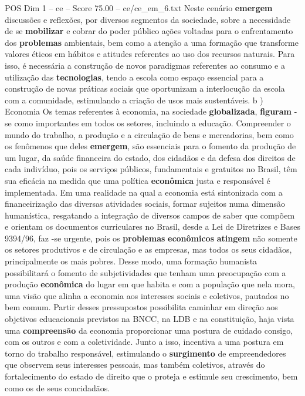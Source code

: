\begin{textsample}{POS Dim 1 – ce – Score 75.00 – ce/ce\_em\_6.txt}
Neste cenário \textbf{emergem} discussões e reflexões, por diversos segmentos da sociedade, sobre a necessidade de se \textbf{mobilizar} e cobrar do poder público ações voltadas para o enfrentamento dos \textbf{problemas} ambientais, bem como a atenção a uma formação que transforme valores éticos em hábitos e atitudes referentes ao uso dos recursos naturais.
Para isso, é necessária a construção de novos paradigmas referentes ao consumo e a utilização das \textbf{tecnologias}, tendo a escola como espaço essencial para a construção de novas práticas sociais que oportunizam a interlocução da escola com a comunidade, estimulando a criação de usos mais sustentáveis. b ) Economia Os temas referentes à economia, na sociedade \textbf{globalizada}, \textbf{figuram} -se como importantes em todos os setores, incluindo a educação.
Compreender o mundo do trabalho, a produção e a circulação de bens e mercadorias, bem como os fenômenos que deles \textbf{emergem}, são essenciais para o fomento da produção de um lugar, da saúde financeira do estado, dos cidadãos e da defesa dos direitos de cada indivíduo, pois os serviços públicos, fundamentais e gratuitos no Brasil, têm sua eficácia na medida que uma política \textbf{econômica} justa e responsável é implementada.
Em uma realidade na qual a economia está sintonizada com a financeirização das diversas atividades sociais, formar sujeitos numa dimensão humanística, resgatando a integração de diversos campos de saber que compõem e orientam os documentos curriculares no Brasil, desde a Lei de Diretrizes e Bases 9394/96, faz -se urgente, pois os \textbf{problemas} \textbf{econômicos} \textbf{atingem} não somente os setores produtivos e de circulação e as empresas, mas todos os seus cidadãos, principalmente os mais pobres.
Desse modo, uma formação humanista possibilitará o fomento de subjetividades que tenham uma preocupação com a produção \textbf{econômica} do lugar em que habita e com a população que nela mora, uma visão que alinha a economia aos interesses sociais e coletivos, pautados no bem comum.
Partir desses pressupostos possibilita caminhar em direção aos objetivos educacionais previstos na BNCC, na LDB e na constituição, haja vista uma \textbf{compreensão} da economia proporcionar uma postura de cuidado consigo, com os outros e com a coletividade.
Junto a isso, incentiva a uma postura em torno do trabalho responsável, estimulando o \textbf{surgimento} de empreendedores que observem seus interesses pessoais, mas também coletivos, através do fortalecimento do estado de direito que o proteja e estimule seu crescimento, bem como os de seus concidadãos.

\end{textsample}
